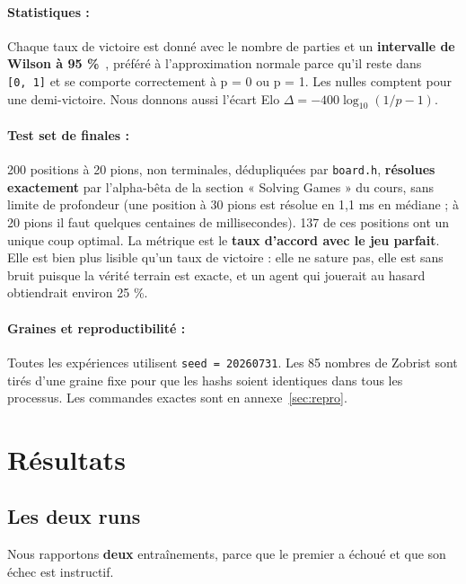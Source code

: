 \documentclass[11pt,a4paper]{article}
\begin{document}
\paragraph{Statistiques :}

Chaque taux de victoire est donné avec le nombre de parties et un \textbf{intervalle de
Wilson à 95 \%}~\cite{wilson1927}, préféré à l'approximation normale parce qu'il reste dans \texttt{{[}0,\ 1{]}}
et se comporte correctement à p = 0 ou p = 1. Les nulles comptent pour une
demi-victoire. Nous donnons aussi l'écart Elo $\Delta = -400\log_{10}(1/p - 1)$.

\paragraph{Test set de finales :}

200 positions à 20 pions, non terminales, dédupliquées par \texttt{board.h}, \textbf{résolues
exactement} par l'alpha-bêta de la section « Solving Games » du cours, sans
limite de profondeur (une position à
30 pions est résolue en 1,1 ms en médiane ; à 20 pions il faut quelques centaines
de millisecondes). 137 de ces positions ont un unique coup optimal. La métrique
est le \textbf{taux d'accord avec le jeu parfait}. Elle est bien plus lisible qu'un taux
de victoire : elle ne sature pas, elle est sans bruit puisque la vérité terrain est
exacte, et un agent qui jouerait au hasard obtiendrait environ 25 \%.

\paragraph{Graines et reproductibilité :}

Toutes les expériences utilisent \texttt{seed\ =\ 20260731}. Les 85 nombres de Zobrist sont
tirés d'une graine fixe pour que les hashs soient identiques dans tous les
processus. Les commandes exactes sont en annexe~\ref{sec:repro}.

\section{Résultats}\label{ruxe9sultats}

\subsection{Les deux runs}\label{les-deux-runs}

Nous rapportons \textbf{deux} entraînements, parce que le premier a échoué et que son
échec est instructif.
\end{document}

